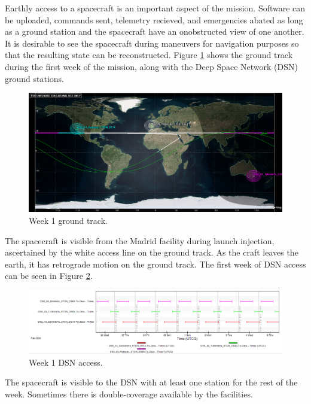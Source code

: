 \documentclass[]{aiaa-tc}%
\begin{document}
Earthly access to a spacecraft is an important aspect of the mission. Software can be uploaded, commands sent, telemetry recieved, and emergencies abated as long as a ground station and the spacecraft have an onobstructed view of one another. It is desirable to see the spacecraft during maneuvers for navigation purposes so that the resulting state can be reconstructed. Figure \ref{fig:week1AccessGT} shows the ground track during the first week of the mission, along with the Deep Space Network (DSN) ground stations.
	\begin{figure}[H]
		\centering
			\includegraphics[width = 12cm]{../Figures/Week1GroundTrack.png}
		\caption{Week 1 ground track. }
		\label{fig:week1AccessGT}
	\end{figure}	

The spacecraft is visible from the Madrid facility during launch injection, ascertained by the white access line on the ground track. As the craft leaves the earth, it has retrograde motion on the ground track. The first week of DSN access can be seen in Figure \ref{fig:week1Access}.
	\begin{figure}[H]
		\centering
			\includegraphics[width = 18cm]{../Figures/Week1Access.png}
		\caption{Week 1 DSN access. }
		\label{fig:week1Access}
	\end{figure}	

 The spacecraft is visible to the DSN with at least one station for the rest of the week. Sometimes there is double-coverage available by the facilities.

	\vspace{5 mm}
\end{document}
